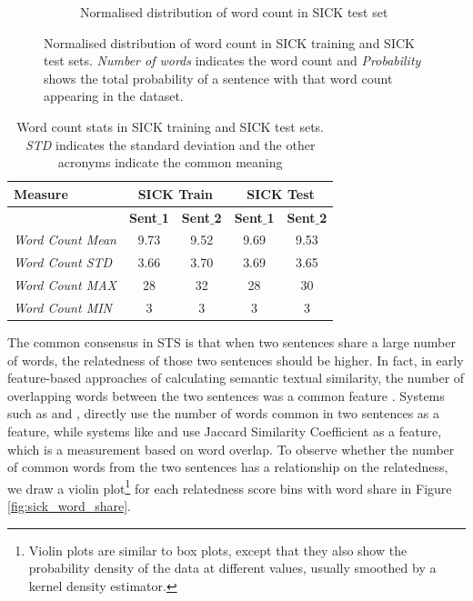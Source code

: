 \begin{enumerate}
\begin{figure}
\begin{subfigure}[b]{.5\textwidth}
		\caption{Normalised distribution of word count in SICK test set}
		\label{fig:sick_test_words}
	\end{subfigure}
	\caption[Normalised distribution of word count in SICK training and SICK test sets.]{Normalised distribution of word count in SICK training and SICK test sets. \textit{Number of words} indicates the word count and \textit{Probability} shows the total probability of a sentence with that word count appearing in the dataset.}
	\label{fig:sick_words}
\end{figure}


\begin{table}
	\centering
	\begin{tabular}{l|cc|cc}
		\hline
		Measure   & \multicolumn{2}{c|}{SICK Train} & \multicolumn{2}{c}{SICK Test} \\
		\hline
		\multicolumn{1}{l|}{} & \textbf{Sent$\_$1} & \textbf{Sent$\_$2} & \textbf{Sent$\_$1} & \textbf{Sent$\_$2} \\
		\textit{Word Count Mean} & 9.73 & 9.52 & 9.69 & 9.53  \\
		\textit{Word Count STD} & 3.66 & 3.70 & 3.69 & 3.65  \\
		\textit{Word Count MAX} & 28 & 32 & 28 & 30  \\
		\textit{Word Count MIN} & 3 & 3 & 3 & 3  \\
		\hline
	\end{tabular}
	\caption[Word count stats in SICK]{Word count stats in SICK training and SICK test sets. \textit{STD} indicates the standard deviation and the other acronyms indicate the common meaning }
	\label{table:sick_sts}
\end{table}



The common consensus in STS is that when two sentences share a large number of words, the relatedness of those two sentences should be higher. In fact, in early feature-based approaches of calculating semantic textual similarity, the number of overlapping words between the two sentences was a common feature \autocite{vilarino-etal-2014-buap,  gupta-etal-2014-uow, lynum-etal-2014-ntnu, chavez-etal-2014-umcc}. Systems such as \textcite{vilarino-etal-2014-buap} and \textcite{lynum-etal-2014-ntnu}, directly use the number of words common in two sentences as a feature, while systems like \textcite{gupta-etal-2014-uow} and \textcite{chavez-etal-2014-umcc} use Jaccard Similarity Coefficient as a feature, which is a measurement based on word overlap. To observe whether the number of common words from the two sentences has a relationship on the relatedness, we draw a violin plot\footnote{Violin plots are similar to box plots, except that they also show the probability density of the data at different values, usually smoothed by a kernel density estimator.} for each relatedness score bins with word share in Figure \ref{fig:sick_word_share}.



\end{enumerate}
